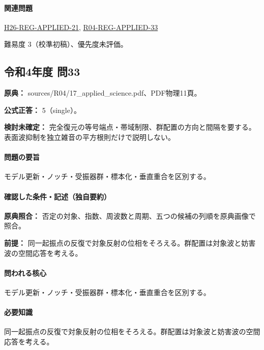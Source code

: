 \paragraph{関連問題} \hyperref[q:h26-reg-applied-21]{H26-REG-APPLIED-21}, \hyperref[q:r04-reg-applied-33]{R04-REG-APPLIED-33}

\par 難易度 3（校準初稿）、優先度未評価。

\subsection{令和4年度 問33}
\label{q:r04-reg-applied-33}

\noindent\textbf{原典：} sources/R04/17\_applied\_science.pdf、PDF物理11頁。

\textbf{公式正答：} 5（single）。

\par\textbf{検討未確定：} 完全復元の等号端点・帯域制限、群配置の方向と間隔を要する。表面波抑制を独立雑音の平方根則だけで説明しない。

\paragraph{問題の要旨} モデル更新・ノッチ・受振器群・標本化・垂直重合を区別する。

\paragraph{確認した条件・記述（独自要約）}\mbox{}\par

\noindent\textbf{原典照合：} 否定の対象、指数、周波数と周期、五つの候補の列順を原典画像で照合。\par

\noindent\textbf{前提：} 同一起振点の反復で対象反射の位相をそろえる。群配置は対象波と妨害波の空間応答を考える。\par

\paragraph{問われる核心} モデル更新・ノッチ・受振器群・標本化・垂直重合を区別する。

\paragraph{必要知識} 同一起振点の反復で対象反射の位相をそろえる。群配置は対象波と妨害波の空間応答を考える。

